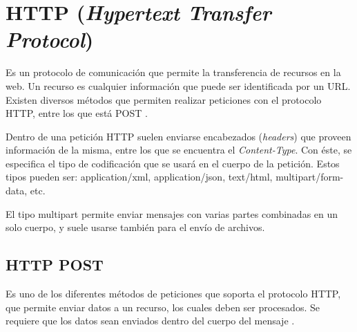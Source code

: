 \section{HTTP (\textit{Hypertext Transfer Protocol})}\label{HTTP}

Es un protocolo de comunicación que permite la transferencia de recursos en la web. Un recurso es cualquier información que puede ser identificada por un URL. Existen diversos métodos que permiten realizar peticiones con el protocolo HTTP, entre los que está POST \cite{HTTP2}. 

Dentro de una petición HTTP suelen enviarse encabezados (\textit{headers}) que proveen información de la misma, entre los que se encuentra el \textit{Content-Type}. Con éste, se especifica el tipo de codificación que se usará en el cuerpo de la petición. Estos tipos pueden ser: application/xml, application/json, text/html, multipart/form-data, etc. 

El tipo multipart permite enviar mensajes con varias partes combinadas en un solo cuerpo, y suele usarse también para el envío de archivos. \cite{HTTP1}

\subsection{HTTP POST}

Es uno de los diferentes métodos de peticiones que soporta el protocolo HTTP, que permite enviar datos a un recurso, los cuales deben ser procesados. Se requiere que los datos sean enviados dentro del cuerpo del mensaje \cite{HTTP3}.

